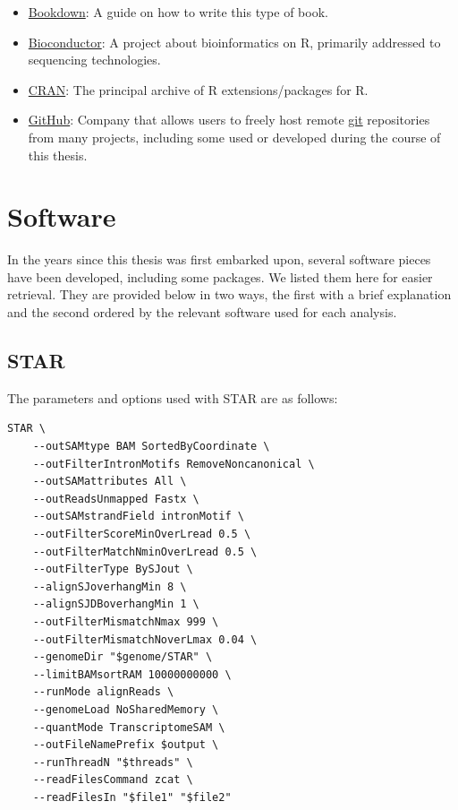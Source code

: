 \documentclass[
  12pt,
  a4paper,
  twoside,
  openright]{book}
\begin{document}
\begin{itemize}
\item
  \href{https://github.com/rstudio/bookdown/}{Bookdown}: A guide on how to write this type of book.
\item
  \href{https://bioconducto.org}{Bioconductor}: A project about bioinformatics on R, primarily addressed to sequencing technologies.
\item
  \href{https://cran.r-project.org}{CRAN}: The principal archive of R extensions/packages for R.
\item
  \href{https://github.com}{GitHub}: Company that allows users to freely host remote \href{https://git-scm.com/}{git} repositories from many projects, including some used or developed during the course of this thesis.
\end{itemize}

\hypertarget{software}{%
\chapter{Software}\label{software}}

In the years since this thesis was first embarked upon, several software pieces have been developed, including some packages.
We listed them here for easier retrieval.
They are provided below in two ways, the first with a brief explanation and the second ordered by the relevant software used for each analysis.

\hypertarget{star}{%
\section{STAR}\label{star}}

The parameters and options used with STAR are as follows:

\begin{verbatim}
STAR \
    --outSAMtype BAM SortedByCoordinate \
    --outFilterIntronMotifs RemoveNoncanonical \
    --outSAMattributes All \
    --outReadsUnmapped Fastx \
    --outSAMstrandField intronMotif \
    --outFilterScoreMinOverLread 0.5 \
    --outFilterMatchNminOverLread 0.5 \
    --outFilterType BySJout \
    --alignSJoverhangMin 8 \
    --alignSJDBoverhangMin 1 \
    --outFilterMismatchNmax 999 \
    --outFilterMismatchNoverLmax 0.04 \
    --genomeDir "$genome/STAR" \
    --limitBAMsortRAM 10000000000 \
    --runMode alignReads \
    --genomeLoad NoSharedMemory \
    --quantMode TranscriptomeSAM \
    --outFileNamePrefix $output \
    --runThreadN "$threads" \
    --readFilesCommand zcat \
    --readFilesIn "$file1" "$file2"
\end{verbatim}
\end{document}
